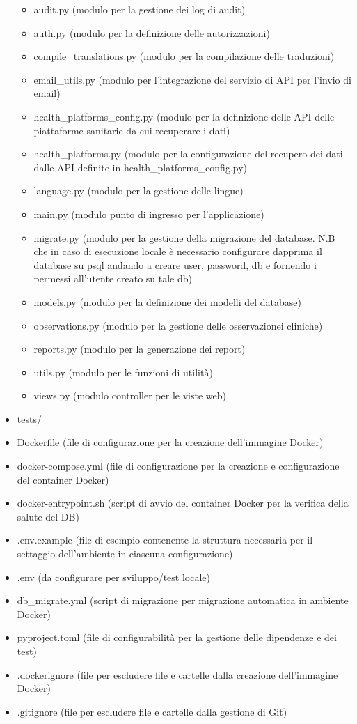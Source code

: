 \documentclass[12pt,a4paper,oneside]{report}
\begin{document}
\begin{itemize}
\begin{itemize}
              \item audit.py (modulo per la gestione dei log di audit)
              \item auth.py (modulo per la definizione delle autorizzazioni)
              \item compile\_translations.py (modulo per la compilazione delle traduzioni)
              \item email\_utils.py (modulo per l'integrazione del servizio di API per l'invio di email)
              \item health\_platforms\_config.py (modulo per la definizione delle API delle piattaforme sanitarie da cui recuperare i dati)
              \item health\_platforms.py (modulo per la configurazione del recupero dei dati dalle API definite in health\_platforms\_config.py)
              \item language.py (modulo per la gestione delle lingue)
              \item main.py (modulo punto di ingresso per l'applicazione)
              \item migrate.py (modulo per la gestione della migrazione del database. N.B che in caso di esecuzione locale è necessario configurare dapprima il database su psql andando a creare user, password, db e fornendo i permessi all'utente creato su tale db)
              \item models.py (modulo per la definizione dei modelli del database)
              \item observations.py (modulo per la gestione delle osservazionei cliniche)
              \item reports.py (modulo per la generazione dei report)
              \item utils.py (modulo per le funzioni di utilità)
              \item views.py (modulo controller per le viste web)
          \end{itemize}
    \item tests/
    \item Dockerfile (file di configurazione per la creazione dell'immagine Docker)
    \item docker-compose.yml (file di configurazione per la creazione e configurazione del container Docker)
    \item docker-entrypoint.sh (script di avvio del container Docker per la verifica della salute del DB)
    \item .env.example (file di esempio contenente la struttura necessaria per il settaggio dell'ambiente in ciascuna configurazione)
    \item .env (da configurare per sviluppo/test locale)
    \item db\_migrate.yml (script di migrazione per migrazione automatica in ambiente Docker)
    \item pyproject.toml (file di configurabilità per la gestione delle dipendenze e dei test)
    \item .dockerignore (file per escludere file e cartelle dalla creazione dell'immagine Docker)
    \item .gitignore (file per escludere file e cartelle dalla gestione di Git)
\end{itemize}
\end{document}
